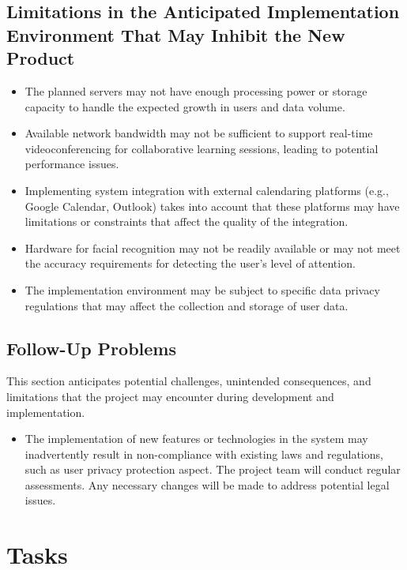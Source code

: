 \documentclass[12pt]{article}
\begin{document}
\subsection{Limitations in the Anticipated Implementation Environment That May
Inhibit the New Product}
\begin{itemize}
    \item The planned servers may not have enough processing power or storage capacity to handle the expected growth in users and data volume.
    
    \item Available network bandwidth may not be sufficient to support real-time videoconferencing for collaborative learning sessions, leading to potential performance issues.
    
    \item Implementing system integration with external calendaring platforms (e.g., Google Calendar, Outlook) takes into account that these platforms may have limitations or constraints that affect the quality of the integration.
    
    \item Hardware for facial recognition may not be readily available or may not meet the accuracy requirements for detecting the user's level of attention.
    
    \item The implementation environment may be subject to specific data privacy regulations that may affect the collection and storage of user data.
\end{itemize}

\subsection{Follow-Up Problems}
This section anticipates potential challenges, unintended consequences, and limitations that the project may encounter during development and implementation.

\begin{itemize}
    \item The implementation of new features or technologies in the system may inadvertently result in non-compliance with existing laws and regulations, such as user privacy protection aspect. The project team will conduct regular assessments. Any necessary changes will be made to address potential legal issues.
\end{itemize}

\section{Tasks}
\end{document}
